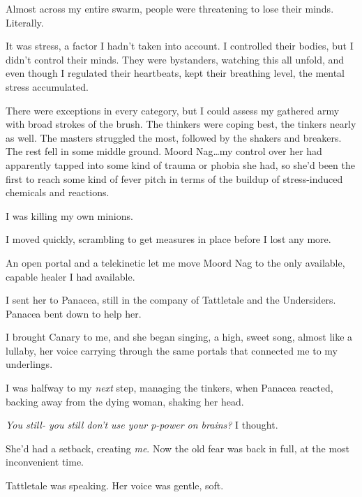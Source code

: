 Almost across my entire swarm, people were threatening to lose their minds.  Literally.



It was stress, a factor I hadn't taken into account.  I controlled their bodies, but I didn't control their minds.  They were bystanders, watching this all unfold, and even though I regulated their heartbeats, kept their breathing level, the mental stress accumulated.



There were exceptions in every category, but I could assess my gathered army with broad strokes of the brush.  The thinkers were coping best, the tinkers nearly as well.  The masters struggled the most, followed by the shakers and breakers.  The rest fell in some middle ground.  Moord Nag\ldots my control over her had apparently tapped into some kind of trauma or phobia she had, so she'd been the first to reach some kind of fever pitch in terms of the buildup of stress-induced chemicals and reactions.



I was killing my own minions.



I moved quickly, scrambling to get measures in place before I lost any more.



An open portal and a telekinetic let me move Moord Nag to the only available, capable healer I had available.



I sent her to Panacea, still in the company of Tattletale and the Undersiders.  Panacea bent down to help her.



I brought Canary to me, and she began singing, a high, sweet song, almost like a lullaby, her voice carrying through the same portals that connected me to my underlings.



I was halfway to my \emph{next }step, managing the tinkers, when Panacea reacted, backing away from the dying woman, shaking her head.



\emph{You still- you still don't use your p-power on brains?  }I thought.



She'd had a setback, creating \emph{me}.  Now the old fear was back in full, at the most inconvenient time.



Tattletale was speaking.  Her voice was gentle, soft.



